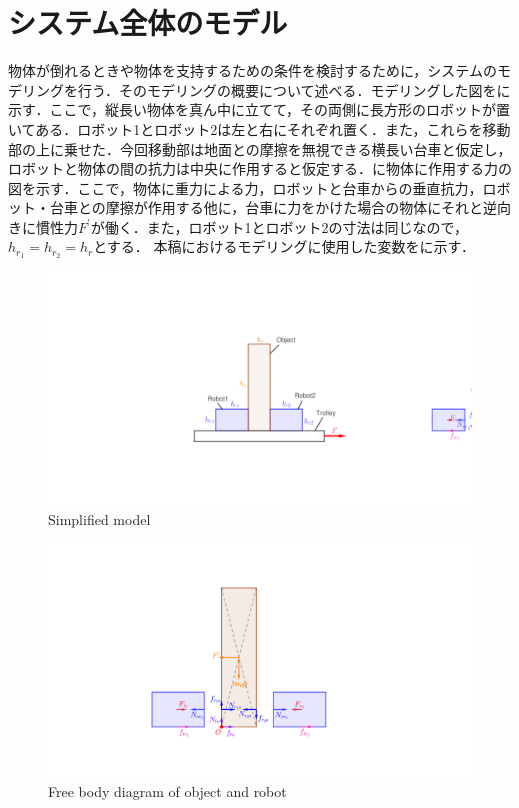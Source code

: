\section{システム全体のモデル}
\label{section:modeling}
物体が倒れるときや物体を支持するための条件を検討するために，システムのモデリングを行う．そのモデリングの概要について述べる．モデリングした図をに示す．ここで，縦長い物体を真ん中に立てて，その両側に長方形のロボットが置いてある．ロボット1とロボット2は左と右にそれぞれ置く．また，これらを移動部の上に乗せた．今回移動部は地面との摩擦を無視できる横長い台車と仮定し，ロボットと物体の間の抗力は中央に作用すると仮定する．に物体に作用する力の図を示す．ここで，物体に重力による力，ロボットと台車からの垂直抗力，ロボット・台車との摩擦が作用する他に，台車に力をかけた場合の物体にそれと逆向きに慣性力$F^{\prime}$が働く．また，ロボット1とロボット2の寸法は同じなので，$h_{r_1}=h_{r_2}=h_{r}$とする．
本稿におけるモデリングに使用した変数をに示す．
\begin{figure}[tb]
  \centering
    \includegraphics[width=0.65\columnwidth]{./figure/carrybot-model.pdf}
    \caption{Simplified model}
\end{figure}
\begin{figure}[tb]
  \centering
    \includegraphics[width=0.65\columnwidth]{./figure/freebody-v2.pdf}
     \caption{Free body diagram of object and robot}
\end{figure}

